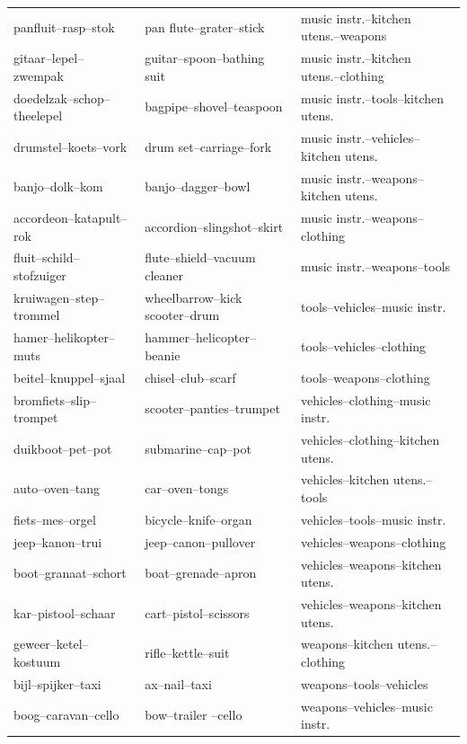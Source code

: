 \documentclass[doc]{apa6}
\begin{document}
\begin{appendix}
\begin{small}
\begin{longtable}{lll}
panfluit--rasp--stok & pan flute--grater--stick & music instr.--kitchen utens.--weapons \\
gitaar--lepel--zwempak & guitar--spoon--bathing suit & music instr.--kitchen utens.--clothing \\
doedelzak--schop--theelepel & bagpipe--shovel--teaspoon & music instr.--tools--kitchen utens. \\
drumstel--koets--vork & drum set--carriage--fork & music instr.--vehicles--kitchen utens. \\
banjo--dolk--kom & banjo--dagger--bowl & music instr.--weapons--kitchen utens. \\
accordeon--katapult--rok & accordion--slingshot--skirt & music instr.--weapons--clothing \\
fluit--schild--stofzuiger & flute--shield--vacuum cleaner & music instr.--weapons--tools \\
kruiwagen--step--trommel & wheelbarrow--kick scooter--drum & tools--vehicles--music instr. \\
hamer--helikopter--muts & hammer--helicopter--beanie & tools--vehicles--clothing \\
beitel--knuppel--sjaal & chisel--club--scarf & tools--weapons--clothing \\
bromfiets--slip--trompet & scooter--panties--trumpet & vehicles--clothing--music instr. \\
duikboot--pet--pot & submarine--cap--pot & vehicles--clothing--kitchen utens. \\
auto--oven--tang & car--oven--tongs & vehicles--kitchen utens.--tools \\
fiets--mes--orgel & bicycle--knife--organ & vehicles--tools--music instr. \\
jeep--kanon--trui & jeep--canon--pullover & vehicles--weapons--clothing \\
boot--granaat--schort & boat--grenade--apron & vehicles--weapons--kitchen utens. \\
kar--pistool--schaar & cart--pistol--scissors & vehicles--weapons--kitchen utens. \\
geweer--ketel--kostuum & rifle--kettle--suit & weapons--kitchen utens.--clothing \\
bijl--spijker--taxi & ax--nail--taxi & weapons--tools--vehicles \\
boog--caravan--cello & bow--trailer --cello & weapons--vehicles--music instr. \\
\end{longtable}
\end{small}


\end{appendix}
\end{document}

